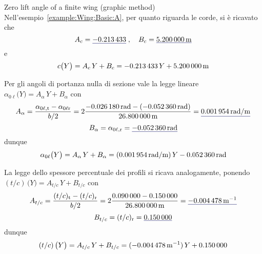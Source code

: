 \documentclass[[12pt,twoside]{book}
\begin{document}
\begin{myExampleX}{Zero lift angle of a finite wing (graphic method)}{\ \myIconGraph\ }
Nell'esempio~\ref{example:Wing:Basic:A}, per quanto riguarda le corde, si è ricavato che
\[
A_c
  = \mathunderline{mydarkblue}{ \SI[round-precision=3]{\myCoeffAChordWing}{} }
\;,\quad
B_c
  = \mathunderline{mydarkblue}{ \SI[round-precision=2]{\myCoeffBChordWingMT}{\metre} }
\]
e
\[
c \big( Y \big) = A_c \, Y + B_c
  = \SI[round-precision=3]{\myCoeffAChordWing}{} \, Y
    + \SI[round-precision=2]{\myCoeffBChordWingMT}{\metre}
\]

Per gli angoli di portanza nulla di sezione vale la legge lineare
$\alpha_{0\ell} \big( Y \big) = A_{\alpha} \, Y + B_{\alpha}$ 
con
\[
A_{\alpha}
  = \frac{\alpha_{0\ell,\mathrm{t}} - \alpha_{0\ell\mathrm{r}}}{b/2}
  = 
    2 \frac{
      \SI[round-precision=4]{\myAlphaZeroLiftTipWingRAD}{\radian} 
        - ( \SI[round-precision=4]{\myAlphaZeroLiftRootWingRAD}{\radian} )
    }{
      \SI[round-precision=2]{\mySpanWingMT}{\metre}
    }
  = \mathunderline{mydarkblue}{ \SI[round-precision=5]{\myCoeffAAeroTwistWingRADMT}{\radian/\metre} }
\]
\[
B_{\alpha}
  = \alpha_{0\ell,\mathrm{r}}
  = \mathunderline{mydarkblue}{ \SI[round-precision=4]{\myAlphaZeroLiftRootWingRAD}{\radian} }
\]
dunque
\[
\alpha_{0\ell} \big( Y \big) = A_{\alpha} \, Y + B_{\alpha}
  = (\SI[round-precision=5]{\myCoeffAAeroTwistWingRADMT}{\radian/\metre}) \, Y
    \SI[round-precision=4]{\myAlphaZeroLiftRootWingRAD}{\radian}
\]

La legge dello spessore percentuale dei profili si ricava analogamente,
ponendo
$(t/c)\,\big( Y \big) = A_{t/c} \, Y + B_{t/c}$ 
con
\[
A_{t/c}
  = \frac{(t/c)_{\mathrm{t}} - (t/c)_{\mathrm{r}}}{b/2}
  = 
    2 \frac{
      \SI[round-precision=2]{\myThicknessOverChordTipWing}{} 
        - \SI[round-precision=4]{\myThicknessOverChordRootWing}{}
    }{
      \SI[round-precision=2]{\mySpanWingMT}{\metre}
    }
  = \mathunderline{mydarkblue}{ \SI[round-precision=5]{\myCoeffAPercThicknessWingMT}{\metre^{-1}} }
\]
\[
B_{t/c}
  = (t/c)_{\mathrm{r}}
  = \mathunderline{mydarkblue}{ \SI[round-precision=2]{\myCoeffBPercThicknessWing}{} }
\]
dunque
\[
(t/c)\,\big( Y \big) = A_{t/c} \, Y + B_{t/c}
  = (\SI[round-precision=5]{\myCoeffAPercThicknessWingMT}{\metre^{-1}}) \, Y
    + \SI[round-precision=2]{\myCoeffBPercThicknessWing}{}
\]


\end{myExampleX}
\end{document}
